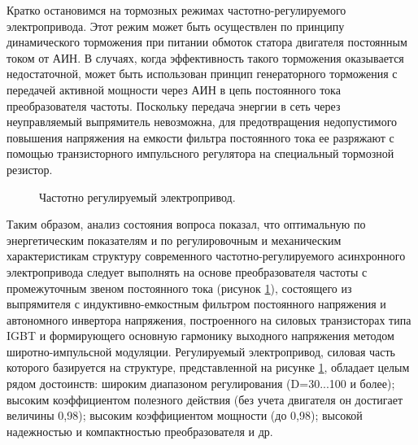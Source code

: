         Кратко остановимся на тормозных режимах частотно-регулируемого
        электропривода. Этот режим может быть осуществлен по принципу
        динамического торможения при питании обмоток статора двигателя
        постоянным током от АИН. В случаях, когда эффективность такого
        торможения оказывается недостаточной, может быть использован принцип
        генераторного торможения с передачей активной мощности через АИН в цепь
        постоянного тока преобразователя частоты. Поскольку передача энергии в
        сеть через неуправляемый выпрямитель невозможна, для предотвращения
        недопустимого повышения напряжения на емкости фильтра постоянного тока
        ее разряжают с помощью транзисторного импульсного регулятора на
        специальный тормозной резистор. 

        \begin{figure}[h!]
            \caption{Частотно регулируемый электропривод.}
            \label{fig:ain}
        \end{figure}

        Таким образом, анализ состояния вопроса показал, что оптимальную по
        энергетическим показателям и по регулировочным и механическим
        характеристикам структуру современного частотно-регулируемого
        асинхронного электропривода следует выполнять на основе преобразователя
        частоты с промежуточным звеном постоянного тока (рисунок
        \ref{fig:ain}), состоящего из выпрямителя с индуктивно-емкостным
        фильтром постоянного напряжения и автономного инвертора напряжения,
        построенного на силовых транзисторах типа IGBT и формирующего основную
        гармонику выходного напряжения методом широтно-импульсной модуляции.
        Регулируемый электропривод, силовая часть которого базируется на
        структуре, представленной на рисунке \ref{fig:ain}, обладает целым
        рядом достоинств: широким диапазоном регулирования (D=30...100 и
        более); высоким коэффициентом полезного действия (без учета двигателя
        он достигает величины 0,98); высоким коэффициентом мощности (до 0,98);
        высокой надежностью и компактностью преобразователя и др. 

        \clearpage

